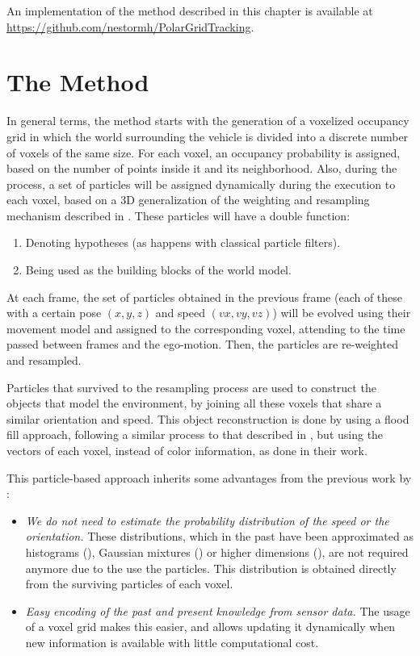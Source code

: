 An implementation of the method described in this chapter is available at \url{https://github.com/nestormh/PolarGridTracking}.

\section{The Method}\label{ch:chapter05_01}

In general terms, the method starts with the generation of a voxelized occupancy grid in which the world surrounding the vehicle is divided into a discrete number of voxels of the same size. For each voxel, an occupancy probability is assigned, based on the number of points inside it and its neighborhood. Also, during the process, a set of particles will be assigned dynamically during the execution to each voxel, based on a 3D generalization of the weighting and resampling mechanism described in \cite{isard1998condensation}. These particles will have a double function:
\begin{enumerate}
 \item Denoting hypotheses (as happens with classical particle filters).
 \item Being used as the building blocks of the world model.
\end{enumerate}

At each frame, the set of particles obtained in the previous frame (each of these with a certain pose ${(x, y, z)}$ and speed ${(vx, vy, vz)}$) will be evolved using their movement model and assigned to the corresponding voxel, attending to the time passed between frames and the ego-motion. Then, the particles are re-weighted and resampled.

Particles that survived to the resampling process are used to construct the objects that model the environment, by joining all these voxels that share a similar orientation and speed. This object reconstruction is done by using a flood fill approach, following a similar process to that described in \cite{broggi2013}, but using the vectors of each voxel, instead of color information, as done in their work.

This particle-based approach inherits some advantages from the previous work by \cite{danescu2012particle}:
\begin{itemize}
 \item \emph{We do not need to estimate the probability distribution of the speed or the orientation.} These distributions, which in the past have been approximated as histograms (\cite{chen2006dynamic}), Gaussian mixtures (\cite{gindele2009bayesian}) or higher dimensions (\cite{coue2006bayesian}), are not required anymore due to the use the particles. This distribution is obtained directly from the surviving particles of each voxel. 
 \item \emph{Easy encoding of the past and present knowledge from sensor data.} The usage of a voxel grid makes this easier, and allows updating it dynamically when new information is available with little computational cost.
\end{itemize}

